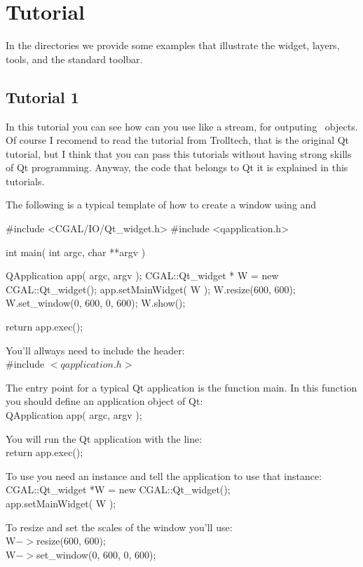 \section{Tutorial}

In the directories  we provide some examples that illustrate the widget, layers, tools, and the standard toolbar.

\subsection*{Tutorial 1}

In this tutorial you can see how can you use  like
a stream, for outputing \cgal\ objects.  Of course I recomend to read
the tutorial from Trolltech, that is the original Qt tutorial, but I
think that you can pass this tutorials without having strong skills of Qt
programming. Anyway, the code that belongs to Qt it is explained in
this tutorials.

The following is a typical template of how to create a window using
 and 

\begin{ccExampleCode}
#include <CGAL/IO/Qt_widget.h>
#include <qapplication.h>

int main( int argc, char **argv )
{
    QApplication app( argc, argv );
    CGAL::Qt_widget * W = new CGAL::Qt_widget();
    app.setMainWidget( W );
    W.resize(600, 600);
    W.set_window(0, 600, 0, 600);
    W.show();

    return app.exec();
}
\end{ccExampleCode}

You'll allways need to include the header:\\
\#include $< qapplication.h >$

The entry point for a typical Qt application is the function main. In
this function you should define an application object of Qt:\\
QApplication app( argc, argv );

You will run the Qt application with the line:\\
return app.exec();

To use  you need an instance and tell the
application to use that instance:\\
CGAL::Qt\_widget *W = new CGAL::Qt\_widget();\\
app.setMainWidget( W );

To resize and set the scales of the window you'll use:\\
W$->$resize(600, 600);\\
W$->$set\_window(0, 600, 0, 600);

